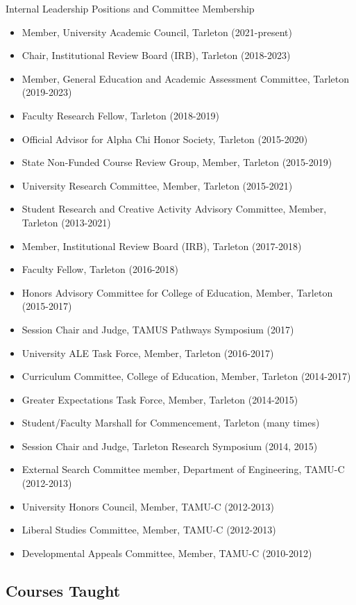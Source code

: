 \documentclass[article,10pt]{article}
\begin{document}
Internal Leadership Positions and Committee Membership

\begin{itemize}
\item Member, University Academic Council, Tarleton (2021-present)
\item Chair, Institutional Review Board (IRB), Tarleton (2018-2023)
\item Member, General Education and Academic Assessment Committee, Tarleton (2019-2023)
\item Faculty Research Fellow, Tarleton (2018-2019)
\item Official Advisor for Alpha Chi Honor Society, Tarleton (2015-2020)
\item State Non-Funded Course Review Group, Member, Tarleton (2015-2019)
\item University Research Committee, Member, Tarleton (2015-2021)
\item Student Research and Creative Activity Advisory Committee, Member, Tarleton (2013-2021)
\item Member, Institutional Review Board (IRB), Tarleton (2017-2018)
\item Faculty Fellow, Tarleton (2016-2018)
\item Honors Advisory Committee for College of Education, Member, Tarleton (2015-2017)
\item Session Chair and Judge, TAMUS Pathways Symposium (2017)
\item University ALE Task Force, Member, Tarleton (2016-2017)
\item Curriculum Committee, College of Education, Member, Tarleton (2014-2017)
\item Greater Expectations Task Force, Member, Tarleton (2014-2015)
\item Student/Faculty Marshall for Commencement, Tarleton (many times)
\item Session Chair and Judge, Tarleton Research Symposium (2014, 2015)
\item External Search Committee member, Department of Engineering, TAMU-C (2012-2013)
\item University Honors Council, Member, TAMU-C (2012-2013)
\item Liberal Studies Committee, Member, TAMU-C (2012-2013)
\item Developmental Appeals Committee, Member, TAMU-C (2010-2012)
\end{itemize}
\subsection*{Courses Taught}
\label{sec:orgcc5935c}
\end{document}
